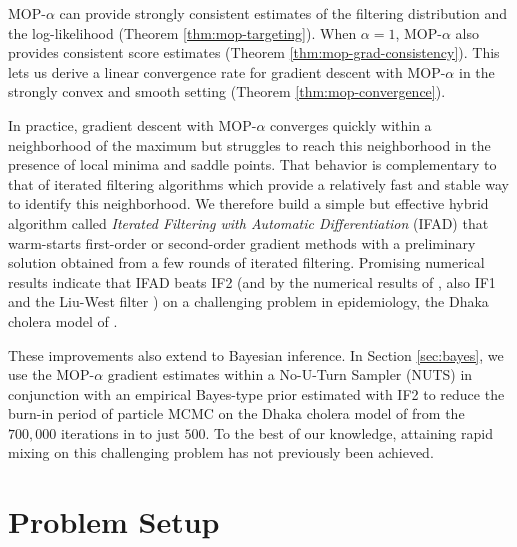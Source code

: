 \documentclass[numsec,webpdf,modern,medium,namedate]{oup-authoring-template}
\theoremstyle{thmstyleone}%
\theoremstyle{thmstyletwo}%
\theoremstyle{thmstylethree}%
\begin{document}
MOP-$\alpha$ can provide strongly consistent estimates of the filtering distribution and the log-likelihood (Theorem \ref{thm:mop-targeting}).
When $\alpha=1$, MOP-$\alpha$ also provides consistent score estimates (Theorem \ref{thm:mop-grad-consistency}). This lets us derive a linear convergence rate for gradient descent with MOP-$\alpha$ in the strongly convex and smooth setting (Theorem \ref{thm:mop-convergence}).

In practice, gradient descent with MOP-$\alpha$ converges quickly within a neighborhood of the maximum but struggles to reach this neighborhood in the presence of local minima and saddle points.
That behavior is complementary to that of iterated filtering algorithms \citep{ionides06-pnas,ionides15} which provide a relatively fast and stable way to identify this neighborhood.
We therefore build a simple but effective hybrid algorithm called {\it Iterated Filtering with Automatic Differentiation} (IFAD) that warm-starts first-order or second-order gradient methods with a preliminary solution obtained from a few rounds of iterated filtering.
Promising numerical results indicate that IFAD beats IF2 (and by the numerical results of \cite{ionides15}, also IF1 \citep{ionides06-pnas,ionides11} and the Liu-West filter \citep{liuwest01}) on a challenging problem in epidemiology, the Dhaka cholera model of \cite{king08}.

These improvements also extend to Bayesian inference. In Section \ref{sec:bayes}, we use the MOP-$\alpha$ gradient estimates within a No-U-Turn Sampler (NUTS) \citep{homan14} in conjunction with an empirical Bayes-type prior estimated with IF2 to reduce the burn-in period of particle MCMC \citep{andrieu10} on the Dhaka cholera model of \cite{king08} from the $700,000$ iterations in \cite{fasiolo16} to just $500$. To the best of our knowledge, attaining rapid mixing on this challenging problem has not previously been achieved. 


\section{Problem Setup}


\end{document}
